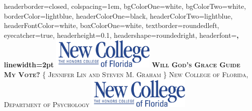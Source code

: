 \documentclass[landscape,a0paper,fontscale=0.285]{baposter} %
\begin{document}
\begin{poster}
{
headerborder=closed, %
colspacing=1em, %
bgColorOne=white, %
bgColorTwo=white, %
borderColor=lightblue, %
headerColorOne=black, %
headerColorTwo=lightblue, %
headerFontColor=white, %
boxColorOne=white, %
textborder=roundedleft, %
eyecatcher=true, %
headerheight=0.1\textheight, %
headershape=roundedright, %
headerfont=\Large\bf\textsc, %
linewidth=2pt %
}
%
{\includegraphics[height=4em]{logo.png}} %
{\bf\textsc{Will God's Grace Guide My Vote?}\vspace{0.5em}} %
{\textsc{\{ Jennifer Lin and Steven M. Graham \} \hspace{12pt} New College of Florida, Department of Psychology}} %
{\includegraphics[height=4em]{logo}} %



\end{poster}
\end{document}
